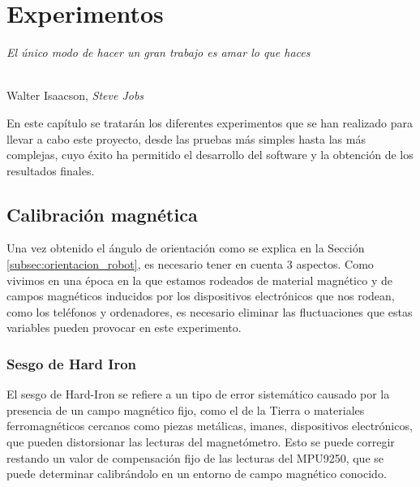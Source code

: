 \chapter{Experimentos}
\label{cap:capitulo6}

\begin{flushright}
\begin{minipage}[]{10cm}
\emph{El único modo de hacer un gran trabajo es amar lo que haces}\\
\end{minipage}\\

Walter Isaacson, \textit{Steve Jobs}\\
\end{flushright}

\vspace{1cm}


En este capítulo se tratarán los diferentes experimentos que se han realizado para llevar a cabo este proyecto, desde las pruebas más simples hasta las más complejas, cuyo éxito ha permitido el desarrollo del software y la obtención de los resultados finales.


\section{Calibración magnética}
\label{sec:cal_mag}

Una vez obtenido el ángulo de orientación como se explica en la Sección \ref{subsec:orientacion_robot}, es necesario tener en cuenta 3 aspectos. Como vivimos en una época en la que estamos rodeados de material magnético y de campos magnéticos inducidos por los dispositivos electrónicos que nos rodean, como los teléfonos y ordenadores, es necesario eliminar las fluctuaciones que estas variables pueden provocar en este experimento.\\

\subsection{Sesgo de Hard Iron}
\label{subsec:hard_iron}

El sesgo de Hard-Iron se refiere a un tipo de error sistemático causado por la presencia de un campo magnético fijo, como el de la Tierra o materiales ferromagnéticos cercanos como piezas metálicas, imanes, dispositivos electrónicos, que pueden distorsionar las lecturas del magnetómetro. Esto se puede corregir restando un valor de compensación fijo de las lecturas del MPU9250, que se puede determinar calibrándolo en un entorno de campo magnético conocido.


